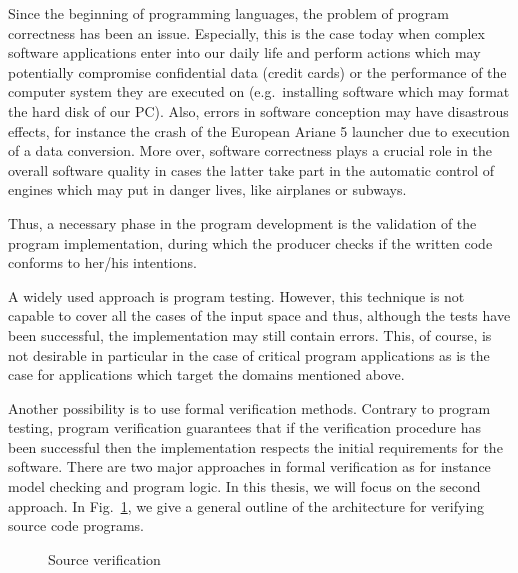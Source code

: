
Since the beginning of programming languages, the problem of program correctness has been an issue. 
Especially, this is the case today when complex software applications  enter into our daily life and perform actions 
which may potentially compromise confidential data (credit cards) or the performance of the
 computer system they are executed on (e.g.\ installing software which may format the hard disk of our PC).
Also, errors in software conception may have disastrous effects, for instance
the crash of the European Ariane 5 launcher due to execution of a data conversion. More over, software correctness
 plays a crucial role in the overall software quality  in cases the latter take part in the automatic 
control of engines which may put in danger lives, like airplanes or subways.


Thus, a necessary phase in the program development is the validation of the program implementation, during which 
the producer checks if the written code conforms to her/his intentions. 


A widely used approach is program testing. However, this technique is not capable
to cover all the cases of the input space and thus, although the tests have been successful, 
the implementation may still contain errors. This, of course, is not desirable in particular in the case of critical 
program applications as is the case for applications which target the domains mentioned above.

 Another possibility is to use formal verification methods. 
Contrary to program testing,  program verification guarantees that if the verification procedure  
has been successful then the implementation respects the initial requirements for the software. There are two major approaches 
in formal verification as for instance model checking and program logic. In this thesis, we will focus on the second approach.  
In Fig.\ \ref{intro:srcVerif}, we give a general outline of the architecture for verifying source code programs.
\begin{figure}[ht!]
\begin{center}
\caption{\sc Source verification}
\label{intro:srcVerif}
\end{center}
\end{figure}

